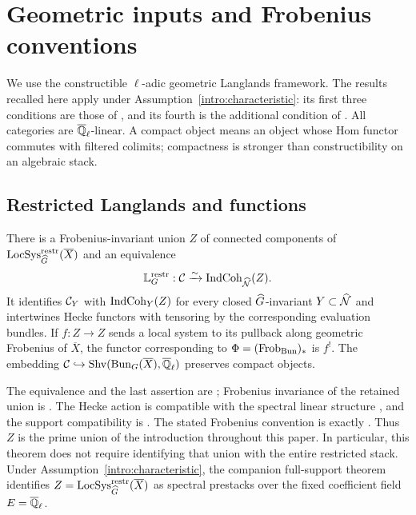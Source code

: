 \section{Geometric inputs and Frobenius conventions}
\label{inp:section}

We use the constructible $\ell$-adic geometric Langlands framework.  The
results recalled here apply under Assumption~\ref{intro:characteristic}:
its first three conditions are those of \cite[\S14.4.1]{AGKRRV1}, and its
fourth is the additional condition of \cite[\S D.1.1]{AGKRRV1}.
All categories are $\overline{\mathbb Q}_{\ell}$-linear.  A compact object means an object whose
Hom functor commutes with filtered colimits; compactness is stronger than
constructibility on an algebraic stack.

\subsection{Restricted Langlands and functions}

\begin{theorem}\label{inp:langlands}
There is a Frobenius-invariant union $Z$ of connected components of
$\operatorname{LocSys}^{\mathrm{restr}}_{\widehat G}(\overline X)$ and an equivalence
\[
 \mathbb L_G^{\mathrm{restr}}:\mathcal C
       \xrightarrow{\sim}\operatorname{IndCoh}_{\widehat{\mathcal N}}(Z).
\]
It identifies $\mathcal C_Y$ with $\operatorname{IndCoh}_Y(Z)$ for every closed
$\widehat G$-invariant $Y\subset\widehat{\mathcal N}$ and intertwines Hecke functors with
tensoring by the corresponding evaluation bundles.  If
$f:Z\to Z$ sends a local system to its pullback along geometric
Frobenius of $\overline X$, the functor corresponding to
$\Phi=(\operatorname{Frob}_{\operatorname{Bun}})_*$ is $f^!$.
The embedding $\mathcal C\hookrightarrow\operatorname{Shv}(\operatorname{Bun}_G(\overline X),\overline{\mathbb Q}_{\ell})$
preserves compact objects.
\end{theorem}

The equivalence and the last assertion are
\cite[Theorems~1.3.9(i) and~1.1.7]{GR}; Frobenius invariance of the
retained union is \cite[\S1.5.4]{GR}.
The Hecke action is compatible with the spectral linear structure
\cite[Lemma~1.3.7]{GR}, and the support compatibility is
\cite[Theorem~4.1.1 and Corollary~4.2.1]{Raskin}.
The stated Frobenius convention is exactly \cite[\S1.3.4]{GLR}.
Thus $Z$ is the prime union of the introduction throughout this paper.
In particular, this theorem does not require identifying that union with
the entire restricted stack.
Under Assumption~\ref{intro:characteristic}, the companion full-support
theorem~\cite[Theorem~1.4, regime~A]{RGLCompanion} identifies
$Z=\operatorname{LocSys}^{\mathrm{restr}}_{\widehat G}(\overline X)$ as spectral prestacks
over the fixed coefficient field $E=\overline{\mathbb Q}_{\ell}$.

